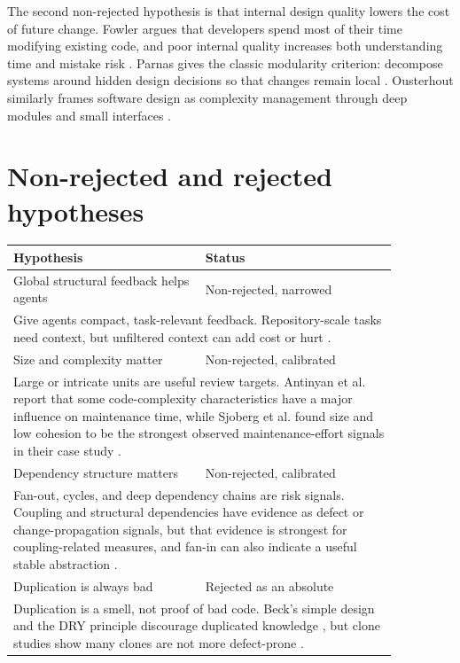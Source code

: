 \documentclass[11pt]{article}
\begin{document}
The second non-rejected hypothesis is that internal design quality lowers the
cost of future change.  Fowler argues that developers spend most of their time
modifying existing code, and poor internal quality increases both understanding
time and mistake risk
\cite{fowler-quality}.  Parnas gives the classic modularity criterion:
decompose systems around hidden design decisions so that changes remain local
\cite{parnas}.  Ousterhout similarly frames software design as complexity
management through deep modules and small interfaces \cite{ousterhout}.

\section{Non-rejected and rejected hypotheses}

\begin{longtable}{p{0.43\linewidth}p{0.43\linewidth}}
\toprule
Hypothesis & Status \\
\midrule
\endhead
\rowcolor{gray!18}
Global structural feedback helps agents & Non-rejected, narrowed \\
\multicolumn{2}{p{0.86\linewidth}}{
Give agents compact, task-relevant feedback.  Repository-scale tasks need
context, but unfiltered context can add cost or hurt
\cite{jimenez-swebench,zhang-codeagent,gloaguen-agents}.} \\[0.35em]

\rowcolor{gray!18}
Size and complexity matter & Non-rejected, calibrated \\
\multicolumn{2}{p{0.86\linewidth}}{
Large or intricate units are useful review targets.  Antinyan et al. report that
some code-complexity characteristics have a major influence on maintenance time,
while Sjoberg et al. found size and low cohesion to be the strongest observed
maintenance-effort signals in their case study \cite{antinyan,sjoberg}.} \\[0.35em]

\rowcolor{gray!18}
Dependency structure matters & Non-rejected, calibrated \\
\multicolumn{2}{p{0.86\linewidth}}{
Fan-out, cycles, and deep dependency chains are risk signals.  Coupling and
structural dependencies have evidence as defect or change-propagation signals,
but that evidence is strongest for coupling-related measures, and fan-in can
also indicate a useful stable abstraction
\cite{elemam,gerosa,parnas}.} \\[0.35em]

\rowcolor{gray!18}
Duplication is always bad & Rejected as an absolute \\
\multicolumn{2}{p{0.86\linewidth}}{
Duplication is a smell, not proof of bad code.  Beck's simple design and the DRY
principle discourage duplicated knowledge \cite{fowler-beck,pragmatic-dry}, but
clone studies show many clones are not more defect-prone \cite{rahman-clones}.} \\[0.35em]


\end{longtable}
\end{document}
